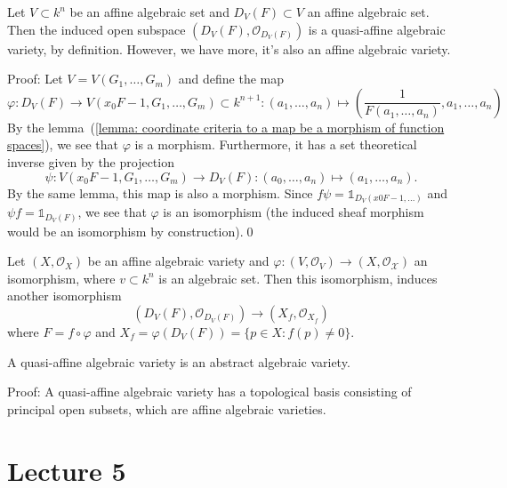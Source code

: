 \begin{dang}
    \begin{lemma}
        Let $V\subset k^n$ be an affine algebraic set and $D_V(F)\subset V$ an affine algebraic set. Then 
        the induced open subspace 
        $(D_V(F), \mathcal{O}_{D_V(F)})$ is a quasi-affine algebraic variety, by definition. However, we have more, 
        it's also an affine algebraic variety.
    \end{lemma}
\end{dang}
Proof: Let $V=V(G_1,\dots, G_m)$ and define the map 
\begin{equation}
    \varphi: D_V(F)\rightarrow V(x_0F-1, G_1,\dots, G_m)\subset k^{n+1}:(a_1,\dots,a_n)\mapsto 
    (\frac{1}{F(a_1,\dots, a_n)},a_1,\dots, a_n)
\end{equation}
By the lemma~(\ref{lemma: coordinate criteria to a map be a morphism of function spaces}), we see that 
$\varphi$ is a morphism. Furthermore, it has a set theoretical inverse given by the projection 
\begin{equation}
    \psi:V(x_0F-1, G_1,\dots, G_m)\to D_V(F):(a_0,\dots,a_n)\mapsto (a_1,\dots, a_n).
\end{equation}
By the same lemma, this map is also a morphism. Since $f\psi = \mathds{1}_{D_V(x0F-1,\dots)}$ and 
$\psi f = \mathds{1}_{D_V(F)}$, we see that $\varphi$ is an isomorphism (the induced 
sheaf morphism would be an isomorphism by construction).\qed

\begin{dang}
    \begin{remark}
        Let $(X,\mathcal{O}_X)$ be an affine algebraic variety and 
        $\varphi:(V,\mathcal{O}_V)\to (X,\mathcal{O_X})$ an isomorphism, where $v\subset k^n$ is an algebraic set. 
        Then this isomorphism, induces another isomorphism
        \begin{equation}
            (D_V(F),\mathcal{O}_{D_V(F)}) \to (X_f,\mathcal{O}_{X_f})
        \end{equation}
        where $F=f\circ\varphi$ and $X_f = \varphi(D_V(F))=\{p\in X: f(p)\neq0\}$.
    \end{remark}
\end{dang}

\begin{dang}
    \begin{corollary}
        A quasi-affine algebraic variety is an abstract algebraic variety.
    \end{corollary}
\end{dang}
Proof: A quasi-affine algebraic variety has a topological basis consisting of principal open subsets, which 
are affine algebraic varieties.



\section{Lecture 5}
